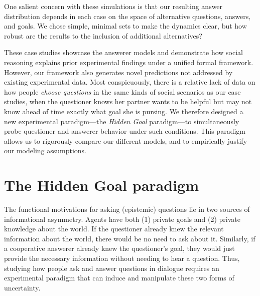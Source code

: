 \documentclass[11pt, floatsintext]{apa6}
\begin{document}


One salient concern with these simulations is that our resulting answer distribution depends in each case on the space of alternative questions, answers, and goals.
We chose simple, minimal sets to make the dynamics clear, but how robust are the results to the inclusion of additional alternatives?

These case studies showcase the answerer models and demonstrate how social reasoning explains prior experimental findings under a unified formal framework. 
However, our framework also generates novel predictions not addressed by existing experimental data.
Most conspicuously, there is a relative lack of data on how people \emph{choose questions} in the same kinds of social scenarios as our case studies, when the questioner knows her partner wants to be helpful but may not know ahead of time exactly what goal she is pursing.
We therefore designed a new experimental paradigm---the \emph{Hidden Goal} paradigm---to simultaneously probe questioner and answerer behavior under such conditions.
This paradigm allows us to rigorously compare our different models, and to empirically justify our modeling assumptions.

\section{The Hidden Goal paradigm}

The functional motivations for asking (epistemic) questions lie in two sources of informational asymmetry. 
Agents have both (1) private goals and (2) private knowledge about the world. 
If the questioner already knew the relevant information about the world, there would be no need to ask about it.
Similarly, if a cooperative answerer already knew the questioner's goal, they would just provide the necessary information without needing to hear a question.
Thus, studying how people ask and answer questions in dialogue requires an experimental paradigm that can induce and manipulate these two forms of uncertainty.
\end{document}
